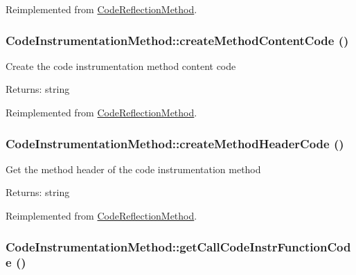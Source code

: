 Reimplemented from \hyperlink{class_code_reflection_method_33a3dcd4331a02b37addbc2fa9281af6}{CodeReflectionMethod}.\hypertarget{class_code_instrumentation_method_731590867f98da76937a4e5a93ec2023}{
\subsubsection[{createMethodContentCode}]{\setlength{\rightskip}{0pt plus 5cm}CodeInstrumentationMethod::createMethodContentCode ()}}
\label{class_code_instrumentation_method_731590867f98da76937a4e5a93ec2023}


Create the code instrumentation method content code

\begin{Desc}
\item[Returns:]string \end{Desc}


Reimplemented from \hyperlink{class_code_reflection_method_4aa609e822a988c2577185932cad79eb}{CodeReflectionMethod}.\hypertarget{class_code_instrumentation_method_0eab7bf9706fa3867605f3db1822c333}{
\subsubsection[{createMethodHeaderCode}]{\setlength{\rightskip}{0pt plus 5cm}CodeInstrumentationMethod::createMethodHeaderCode ()}}
\label{class_code_instrumentation_method_0eab7bf9706fa3867605f3db1822c333}


Get the method header of the code instrumentation method

\begin{Desc}
\item[Returns:]string \end{Desc}


Reimplemented from \hyperlink{class_code_reflection_method_c4b3d9a1c136135c42a66302f52c66c5}{CodeReflectionMethod}.\hypertarget{class_code_instrumentation_method_3442d8655a04e40edaf9626499fe9328}{
\subsubsection[{getCallCodeInstrFunctionCode}]{\setlength{\rightskip}{0pt plus 5cm}CodeInstrumentationMethod::getCallCodeInstrFunctionCode ()}}
\label{class_code_instrumentation_method_3442d8655a04e40edaf9626499fe9328}


